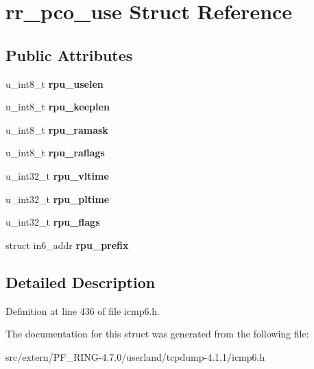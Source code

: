 \hypertarget{structrr__pco__use}{
\section{rr\_\-pco\_\-use Struct Reference}
\label{structrr__pco__use}
}
\subsection*{Public Attributes}
\begin{DoxyCompactItemize}
\item 
\hypertarget{structrr__pco__use_ad4adf50c0623a085f3c796a16e85dbf7}{
u\_\-int8\_\-t {\bfseries rpu\_\-uselen}}
\label{structrr__pco__use_ad4adf50c0623a085f3c796a16e85dbf7}

\item 
\hypertarget{structrr__pco__use_a874f217c149bbfdc24049ce942277cdc}{
u\_\-int8\_\-t {\bfseries rpu\_\-keeplen}}
\label{structrr__pco__use_a874f217c149bbfdc24049ce942277cdc}

\item 
\hypertarget{structrr__pco__use_a73c7e5dc57d72610bbdd665a4f047804}{
u\_\-int8\_\-t {\bfseries rpu\_\-ramask}}
\label{structrr__pco__use_a73c7e5dc57d72610bbdd665a4f047804}

\item 
\hypertarget{structrr__pco__use_a21dfb807470dbb4f9eddffd1b6880df8}{
u\_\-int8\_\-t {\bfseries rpu\_\-raflags}}
\label{structrr__pco__use_a21dfb807470dbb4f9eddffd1b6880df8}

\item 
\hypertarget{structrr__pco__use_a4a3dd2f4aa2eab13871dc64f5d68fafa}{
u\_\-int32\_\-t {\bfseries rpu\_\-vltime}}
\label{structrr__pco__use_a4a3dd2f4aa2eab13871dc64f5d68fafa}

\item 
\hypertarget{structrr__pco__use_a2e711382273480355353721494fb0a09}{
u\_\-int32\_\-t {\bfseries rpu\_\-pltime}}
\label{structrr__pco__use_a2e711382273480355353721494fb0a09}

\item 
\hypertarget{structrr__pco__use_a5e27a7b07f55a5036796d0e209c84562}{
u\_\-int32\_\-t {\bfseries rpu\_\-flags}}
\label{structrr__pco__use_a5e27a7b07f55a5036796d0e209c84562}

\item 
\hypertarget{structrr__pco__use_ac7f65a8ae34c579a317987a864732df4}{
struct in6\_\-addr {\bfseries rpu\_\-prefix}}
\label{structrr__pco__use_ac7f65a8ae34c579a317987a864732df4}

\end{DoxyCompactItemize}


\subsection{Detailed Description}


Definition at line 436 of file icmp6.h.



The documentation for this struct was generated from the following file:\begin{DoxyCompactItemize}
\item 
src/extern/PF\_\-RING-\/4.7.0/userland/tcpdump-\/4.1.1/icmp6.h\end{DoxyCompactItemize}
